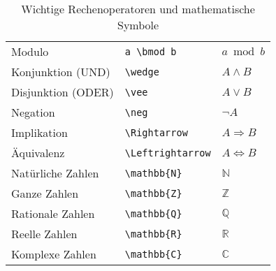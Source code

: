 \begin{table}[H]
\begin{tabular}{lll}
        Modulo                  & \texttt{a \textbackslash bmod b}                                    & $ a \bmod b $              \\
        Konjunktion (UND)       & \texttt{\textbackslash wedge}                                       & $ A \wedge B $             \\
        Disjunktion (ODER)      & \texttt{\textbackslash vee}                                         & $ A \vee B $               \\
        Negation                & \texttt{\textbackslash neg}                                         & $ \neg A $                 \\
        Implikation             & \texttt{\textbackslash Rightarrow}                                  & $ A \Rightarrow B $        \\
        Äquivalenz              & \texttt{\textbackslash Leftrightarrow}                              & $ A \Leftrightarrow B $    \\
        Natürliche Zahlen       & \texttt{\textbackslash mathbb\{N\}}                                 & \( \mathbb{N} \)           \\
        Ganze Zahlen            & \texttt{\textbackslash mathbb\{Z\}}                                 & \( \mathbb{Z} \)           \\
        Rationale Zahlen        & \texttt{\textbackslash mathbb\{Q\}}                                 & \( \mathbb{Q} \)           \\
        Reelle Zahlen           & \texttt{\textbackslash mathbb\{R\}}                                 & \( \mathbb{R} \)           \\
        Komplexe Zahlen         & \texttt{\textbackslash mathbb\{C\}}                                 & \( \mathbb{C} \)           \\
        \bottomrule
    \end{tabular}
    \caption{Wichtige Rechenoperatoren und mathematische Symbole}
    \label{tab:operatoren}
\end{table}